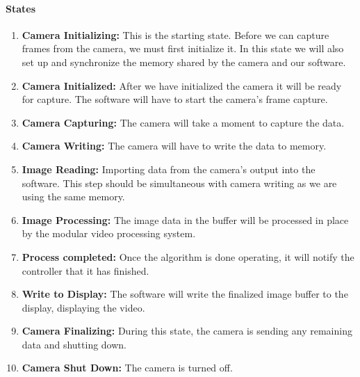 	\paragraph{States}
	
	\begin{enumerate}[leftmargin=2cm,labelindent=2cm]
	\item \textbf{Camera Initializing:}
	This is the starting state. Before we can capture frames from the camera, we must first initialize it. In this state we will also set up and synchronize the memory shared by the camera and our software.

	\item \textbf{Camera Initialized:}
	After we have initialized the camera it will be ready for capture. The software will have to start the camera's frame capture.

	\item \textbf{Camera Capturing:}
	The camera will take a moment to capture the data.

	\item \textbf{Camera Writing:} 
	The camera will have to write the data to memory. 

	\item \textbf{Image Reading:}
	Importing data from the camera's output into the software. This step should be simultaneous with camera writing as we are using the same 		memory. 

	\item \textbf{Image Processing:} 
	The image data in the buffer will be processed in place by the modular video processing system.

	\item \textbf{Process completed:}
	Once the algorithm is done operating, it will notify the controller that it has finished.

	\item \textbf{Write to Display:}
	The software will write the finalized image buffer to the display, displaying the video.

	\item \textbf{Camera Finalizing:}
	During this state, the camera is sending any remaining data and shutting down.

	\item \textbf{Camera Shut Down:}
	The camera is turned off. \\
	\end{enumerate}
	
